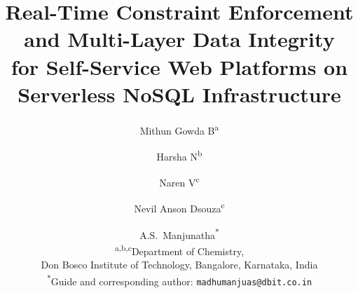 \documentclass[11pt,a4paper]{article}
\theoremstyle{plain}
\theoremstyle{definition}
\begin{document}

\title{Real-Time Constraint Enforcement and Multi-Layer Data Integrity\\ for Self-Service Web Platforms on Serverless NoSQL Infrastructure}

\author{
Mithun Gowda B\textsuperscript{a} \and
Harsha N\textsuperscript{b} \and
Naren V\textsuperscript{c} \and
Nevil Anson Dsouza\textsuperscript{c} \and
A.S.\ Manjunatha\textsuperscript{*} \\[4pt]
\small \textsuperscript{a,b,c}Department of Chemistry,\\
\small Don Bosco Institute of Technology, Bangalore, Karnataka, India\\[2pt]
\small \textsuperscript{*}Guide and corresponding author: \texttt{madhumanjuas@dbit.co.in}
}

\date{}

\maketitle
\end{document}
